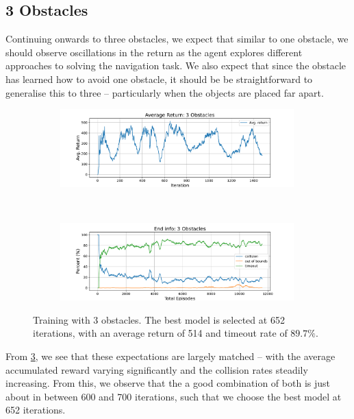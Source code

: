 \subsection{3 Obstacles}
\label{subsec:7_3_obstacles}
Continuing onwards to three obstacles, we expect that similar to one obstacle, we should observe oscillations in the return as the agent explores different approaches to solving the navigation task. We also expect that since the obstacle has learned how to avoid one obstacle, it should be be straightforward to generalise this to three -- particularly when the objects are placed far apart.
\begin{figure}[htb]
    \centering
    \begin{subfigure}[b]{\textwidth}
        \centering
        \captionsetup{justification=centering}
        \includegraphics[width=0.99\textwidth]{figures/7_/3DCarModel_BodyObs_NavSetup_3_NewObs_v1_reward.pdf}
        \label{fig:3_obst_nav_rew}
    \end{subfigure} \\
    \begin{subfigure}[b]{\textwidth}
        \centering
        \captionsetup{justification=centering}
        \includegraphics[width=0.99\textwidth]{figures/7_/3DCarModel_BodyObs_NavSetup_3_NewObs_v1_end_info.pdf}
        \label{fig:3_obst_nav_end}
    \end{subfigure} 
    \caption{Training with 3 obstacles. The best model is selected at 652 iterations, with an average return of 514 and timeout rate of $89.7\%$.} %
    \label{fig:7_train_nav_3_obst}
\end{figure}
From \cref{fig:7_train_nav_3_obst}, we see that these expectations are largely matched -- with the average accumulated reward varying significantly and the collision rates steadily increasing. From this, we observe that the a good combination of both is just about in between 600 and 700 iterations, such that we choose the best model at 652 iterations.

